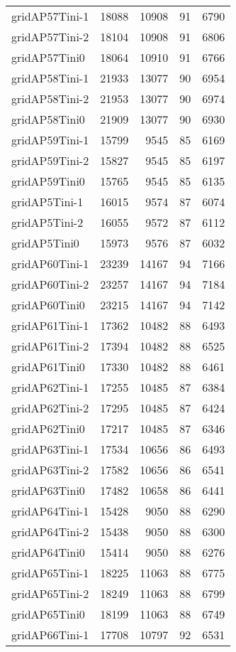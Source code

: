 \begin{longtable}{lrrrr}
gridAP57Tini-1 & 18088 & 10908 & 91 & 6790 \\
gridAP57Tini-2 & 18104 & 10908 & 91 & 6806 \\
gridAP57Tini0 & 18064 & 10910 & 91 & 6766 \\
gridAP58Tini-1 & 21933 & 13077 & 90 & 6954 \\
gridAP58Tini-2 & 21953 & 13077 & 90 & 6974 \\
gridAP58Tini0 & 21909 & 13077 & 90 & 6930 \\
gridAP59Tini-1 & 15799 & 9545 & 85 & 6169 \\
gridAP59Tini-2 & 15827 & 9545 & 85 & 6197 \\
gridAP59Tini0 & 15765 & 9545 & 85 & 6135 \\
gridAP5Tini-1 & 16015 & 9574 & 87 & 6074 \\
gridAP5Tini-2 & 16055 & 9572 & 87 & 6112 \\
gridAP5Tini0 & 15973 & 9576 & 87 & 6032 \\
gridAP60Tini-1 & 23239 & 14167 & 94 & 7166 \\
gridAP60Tini-2 & 23257 & 14167 & 94 & 7184 \\
gridAP60Tini0 & 23215 & 14167 & 94 & 7142 \\
gridAP61Tini-1 & 17362 & 10482 & 88 & 6493 \\
gridAP61Tini-2 & 17394 & 10482 & 88 & 6525 \\
gridAP61Tini0 & 17330 & 10482 & 88 & 6461 \\
gridAP62Tini-1 & 17255 & 10485 & 87 & 6384 \\
gridAP62Tini-2 & 17295 & 10485 & 87 & 6424 \\
gridAP62Tini0 & 17217 & 10485 & 87 & 6346 \\
gridAP63Tini-1 & 17534 & 10656 & 86 & 6493 \\
gridAP63Tini-2 & 17582 & 10656 & 86 & 6541 \\
gridAP63Tini0 & 17482 & 10658 & 86 & 6441 \\
gridAP64Tini-1 & 15428 & 9050 & 88 & 6290 \\
gridAP64Tini-2 & 15438 & 9050 & 88 & 6300 \\
gridAP64Tini0 & 15414 & 9050 & 88 & 6276 \\
gridAP65Tini-1 & 18225 & 11063 & 88 & 6775 \\
gridAP65Tini-2 & 18249 & 11063 & 88 & 6799 \\
gridAP65Tini0 & 18199 & 11063 & 88 & 6749 \\
gridAP66Tini-1 & 17708 & 10797 & 92 & 6531 \\

\end{longtable}
